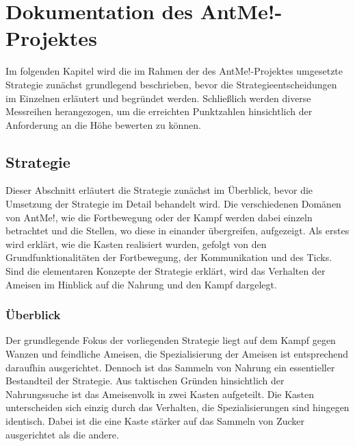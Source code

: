 \section{Dokumentation des AntMe!-Projektes}
\label{doku}

Im folgenden Kapitel wird die im Rahmen der des AntMe!-Projektes umgesetzte Strategie zunächst grundlegend beschrieben, bevor die Strategieentscheidungen im Einzelnen erläutert und begründet werden. Schließlich werden diverse Messreihen herangezogen, um die erreichten Punktzahlen hinsichtlich der Anforderung an die Höhe bewerten zu können.

\subsection{Strategie}
Dieser Abschnitt erläutert die Strategie zunächst im Überblick, bevor die Umsetzung der Strategie im Detail behandelt wird. Die verschiedenen Domänen von AntMe!, wie die Fortbewegung oder der Kampf werden dabei einzeln betrachtet und die Stellen, wo diese in einander übergreifen, aufgezeigt. Als erstes wird erklärt, wie die Kasten realisiert wurden, gefolgt von den Grundfunktionalitäten der Fortbewegung, der Kommunikation und des Ticks. Sind die elementaren Konzepte der Strategie erklärt, wird das Verhalten der Ameisen im Hinblick auf die Nahrung und den Kampf dargelegt.

\subsubsection{Überblick} \label{ssec:overview}
Der grundlegende Fokus der vorliegenden Strategie liegt auf dem Kampf gegen Wanzen und feindliche Ameisen, die Spezialisierung der Ameisen ist entsprechend daraufhin ausgerichtet. Dennoch ist das Sammeln von Nahrung ein essentieller Bestandteil der Strategie. Aus taktischen Gründen hinsichtlich der Nahrungssuche ist das Ameisenvolk in zwei Kasten aufgeteilt. Die Kasten unterscheiden sich einzig durch das Verhalten, die Spezialisierungen sind hingegen identisch. Dabei ist die eine Kaste stärker auf das Sammeln von Zucker ausgerichtet als die andere.

